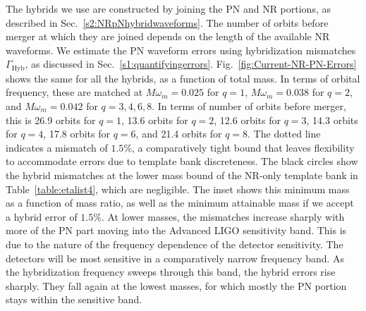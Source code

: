\documentclass[aps,
prd,
twocolumn,
superscriptaddress,
lengthcheck,showpacs,letterpaper,nofootinbib,
floatfix]{revtex4-1}
\newcommand{\Hyb}{\mathrm{Hyb}}
\begin{document}
The hybrids we use are constructed by joining the PN and NR portions, as 
described in Sec.~\ref{s2:NRpNhybridwaveforms}. The number of orbits before 
merger at which they are joined depends on the length of the available NR 
waveforms. We estimate the PN waveform errors using hybridization
mismatches $\Gamma_\Hyb$, as discussed in Sec.~\ref{s1:quantifyingerrors}. 
Fig.~\ref{fig:Current-NR-PN-Errors} shows the same for all the hybrids, as a 
function of total mass. In terms of orbital frequency, these are
matched at $M\omega_m=0.025$ for $q=1$, $M\omega_m=0.038$ for $q=2$,
and $M\omega_m=0.042$ for $q=3,4,6,8$. In terms of number of orbits
before merger, this is 26.9 orbits for $q=1$, 13.6 orbits for $q=2$,
12.6 orbits for $q=3$, 14.3 orbits for $q=4$, 17.8 orbits for $q=6$,
and 21.4 orbits for $q=8$. The dotted line indicates a mismatch of
$1.5\%$, a comparatively tight bound that leaves flexibility to accommodate
errors due to template bank discreteness. The black circles show the hybrid
mismatches at the lower mass bound of the NR-only template bank in
Table~\ref{table:etalist4}, which are negligible. The inset shows this minimum 
mass as a function of mass ratio, as well as the minimum attainable mass if we
accept a hybrid error of $1.5\%$. At lower masses, the mismatches increase
sharply with more of the PN part moving into the Advanced LIGO sensitivity band.
This is due to the nature of the frequency dependence of the detector 
sensitivity. The detectors will be most sensitive in a comparatively
narrow frequency band. As the hybridization frequency sweeps through this band, 
the hybrid errors rise sharply. They fall again at the lowest masses, for which
mostly the PN portion stays within the sensitive band.
\end{document}
